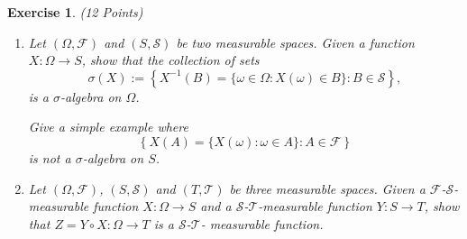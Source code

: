 \documentclass[DIV=classic,a4paper,10pt]{scrartcl}
\newtheorem{exercise}[theorem]{Exercise}
\theoremstyle{nonumberplain}
\numberwithin{equation}{section}
\begin{document}
\begin{exercise} (12 Points)
    \begin{enumerate}[label=(\alph*), fullwidth]

        \item Let $(\Omega,\mathcal{F})$ and $(S,\mathcal{S})$ be two measurable spaces.
            Given a function $X:\Omega \to S$, show that the collection of sets
            \begin{equation*}
                \sigma(X):=\left\{ X^{-1}(B)=\{\omega \in \Omega\colon X(\omega)\in B\}\colon B\in \mathcal{S} \right\},
            \end{equation*}
            is a $\sigma$-algebra on $\Omega$.

            Give a simple example where 
            \begin{equation*}
                \left\{  X(A)=\{X(\omega)\colon \omega \in A\}\colon A\in \mathcal{F}\right\}
            \end{equation*}
            is not a $\sigma$-algebra on $S$.
        \item Let $(\Omega,\mathcal{F})$, $(S,\mathcal{S})$ and $(T,\mathcal{T})$ be three measurable spaces.
            Given a $\mathcal{F}$-$\mathcal{S}$-measurable function $X:\Omega \to S$ and a $\mathcal{S}$-$\mathcal{T}$-measurable function $Y:S\to T$, show that $Z=Y\circ X:\Omega \to T$ is a $\mathcal{S}$-$\mathcal{T}$- measurable function.


\end{enumerate}
\end{exercise}
\end{document}

